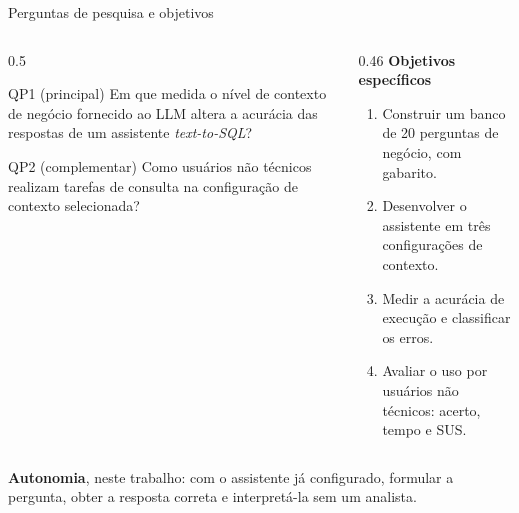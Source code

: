 \documentclass[aspectratio=169,10pt]{beamer}
\begin{document}
\begin{frame}{Perguntas de pesquisa e objetivos}
  \begin{columns}[T,onlytextwidth]
    \begin{column}{0.5\textwidth}
      \begin{block}{QP1 (principal)}
        Em que medida o nível de contexto de negócio fornecido ao LLM altera a acurácia
        das respostas de um assistente \textit{text-to-SQL}?
      \end{block}
      \begin{exampleblock}{QP2 (complementar)}
        Como usuários não técnicos realizam tarefas de consulta na configuração de contexto selecionada?
      \end{exampleblock}
    \end{column}
    \begin{column}{0.46\textwidth}
      \textbf{\color{UnBAzul}Objetivos específicos}
      \begin{enumerate}
        \item Construir um banco de 20 perguntas de negócio, com gabarito.
        \item Desenvolver o assistente em três configurações de contexto.
        \item Medir a acurácia de execução e classificar os erros.
        \item Avaliar o uso por usuários não técnicos: acerto, tempo e SUS.
      \end{enumerate}
    \end{column}
  \end{columns}
  \vspace{1mm}
  {\footnotesize \textbf{Autonomia}, neste trabalho: com o assistente já configurado, formular a pergunta,
  obter a resposta correta e interpretá-la sem um analista.}
\end{frame}
\end{document}
